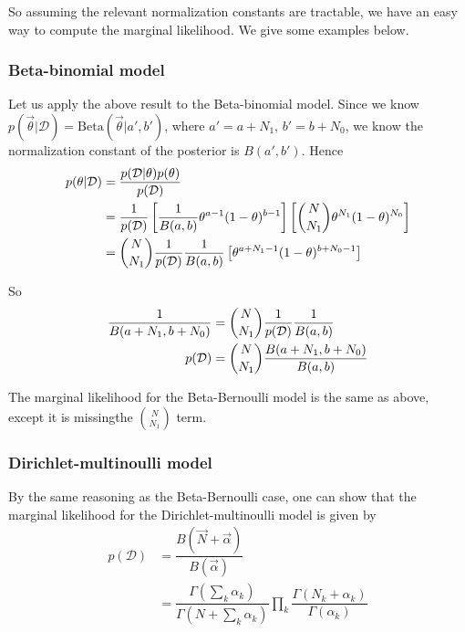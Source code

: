 So assuming the relevant normalization constants are tractable, we have an easy way to compute the marginal likelihood. We give some examples below.

\subsubsection{Beta-binomial model}
Let us apply the above result to the Beta-binomial model. Since we know $p(\vec{\theta}|\mathcal{D})=\mathrm{Beta}(\vec{\theta}|a',b')$, where $a'=a+N_1$, $b'=b+N_0$, we know the normalization constant of the posterior is $B(a',b')$. Hence
\begin{align}
p(\theta|\mathcal{D})& =\dfrac{p(\mathcal{D}|\theta)p(\theta)}{p(\mathcal{D})} \\
    & =\dfrac{1}{p(\mathcal{D})}\left[\dfrac{1}{B(a,b)}\theta^{a-1}(1-\theta)^{b-1}\right]\left[\dbinom{N}{N_1}\theta^{N_1}(1-\theta)^{N_0}\right] \\
	& =\dbinom{N}{N_1}\dfrac{1}{p(\mathcal{D})}\dfrac{1}{B(a,b)}\left[\theta^{a+N_1-1}(1-\theta)^{b+N_0-1}\right]
\end{align}

So
\begin{align}
\dfrac{1}{B(a+N_1,b+N_0)} & = \dbinom{N}{N_1}\dfrac{1}{p(\mathcal{D})}\dfrac{1}{B(a,b)} \\
p(\mathcal{D}) & = \dbinom{N}{N_1}\dfrac{B(a+N_1,b+N_0)}{B(a,b)}
\end{align}

The marginal likelihood for the Beta-Bernoulli model is the same as above, except it is missingthe $\binom{N}{N_1}$ term.

\subsubsection{Dirichlet-multinoulli model}
By the same reasoning as the Beta-Bernoulli case, one can show that the marginal likelihood for the Dirichlet-multinoulli model is given by
\begin{align}
p(\mathcal{D}) & =\dfrac{B(\vec{N}+\vec{\alpha})}{B(\vec{\alpha})} \\
   & = \dfrac{\Gamma(\sum_k \alpha_k)}{\Gamma(N+\sum_k \alpha_k)}\prod\limits_k \dfrac{\Gamma(N_k+\alpha_k)}{\Gamma(\alpha_k)}
\end{align}

